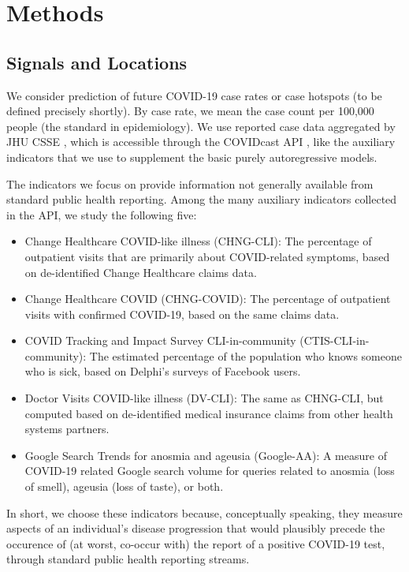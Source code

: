 \documentclass[9pt,twocolumn,twoside,lineno]{pnas-new}
\begin{document}
\section{Methods}

\subsection{Signals and Locations}

We consider prediction of future COVID-19 case rates or case hotspots (to be
defined precisely shortly).  By case rate, we mean the case count per 100,000
people (the standard in epidemiology).  We use reported case data aggregated by 
JHU CSSE \cite{Dong:2020}, which is accessible through the COVIDcast API
\cite{CovidcastAPI}, like the auxiliary indicators that we use to supplement the
basic purely autoregressive models.   

The indicators we focus on provide information not generally available from
standard public health reporting. Among the many auxiliary indicators collected
in the API, we study the following five:  
\begin{itemize}
\item Change Healthcare COVID-like illness (CHNG-CLI): The percentage of
  outpatient visits that are primarily about COVID-related symptoms, based on
  de-identified Change Healthcare claims data.
\item Change Healthcare COVID (CHNG-COVID): The percentage of outpatient visits
  with confirmed COVID-19, based on the same claims data.
\item COVID Tracking and Impact Survey CLI-in-community (CTIS-CLI-in-community): 
  The estimated percentage of the population who knows someone who is sick,
  based on Delphi's surveys of Facebook users.
\item Doctor Visits COVID-like illness (DV-CLI): The same as CHNG-CLI, but
  computed based on de-identified medical insurance claims from other health
  systems partners.  
\item Google Search Trends for anosmia and ageusia (Google-AA): A measure of 
  COVID-19 related Google search volume for queries related to anosmia (loss of
  smell), ageusia (loss of taste), or both.  
\end{itemize}
In short, we choose these indicators because, conceptually speaking, they
measure aspects of an individual's disease progression that would plausibly
precede the occurence of (at worst, co-occur  with) the report of a positive
COVID-19 test, through standard public health reporting streams.
\end{document}
